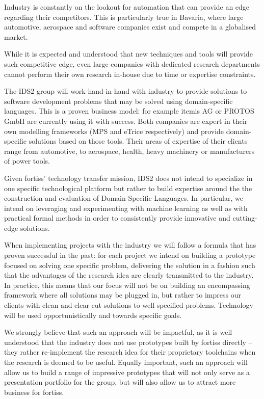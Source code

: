 \documentclass{article}
\begin{document}
Industry is constantly on the lookout for automation that can provide an edge
regarding their competitors. This is particularly true in Bavaria, where large
automotive, aerospace and software companies exist and compete in a globalised
market.

While it is expected and understood that new techniques and tools will provide
such competitive edge, even large companies with dedicated research departments
cannot perform their own research in-house due to time or expertise constraints.

The IDS2 group will work hand-in-hand with industry to provide solutions to
software development problems that may be solved using domain-specific
languages. This is a proven business model: for example itemis AG or PROTOS GmbH
are currently using it with success. Both companies are expert in
their own modelling frameworks (MPS and eTrice respectively) and provide domain-specific
solutions based on those tools. Their areas of expertise of their clients range
from automotive, to aerospace, health, heavy machinery or manufacturers of power
tools.

Given fortiss' technology transfer mission, IDS2 does not intend to specialize
in one specific technological platform but rather to build expertise around the
the construction and evaluation of Domain-Specific Languages. In particular, we
intend on leveraging and experimenting with machine learning as well as with
practical formal methods in order to consistently provide innovative and
cutting-edge solutions.

When implementing projects with the industry we will follow a formula that has
proven successful in the past: for each project we intend on building a
prototype focused on solving one specific problem, delivering the solution in a
fashion such that the advantages of the research idea are clearly transmitted to
the industry. In practice, this means that our focus will not be on building an
encompassing framework where all solutions may be plugged in, but rather to
impress our clients with clean and clear-cut solutions to well-specified
problems. Technology will be used opportunistically and towards specific goals.

We strongly believe that such an approach will be impactful, as it is well
understood that the industry does not use prototypes built by fortiss directly
-- they rather re-implement the research idea for their proprietary toolchains when
the research is deemed to be useful. Equally important, such an approach will
allow us to build a range of impressive prototypes that will not only serve as a
presentation portfolio for the group, but will also allow us to attract more
business for fortiss.
\end{document}
